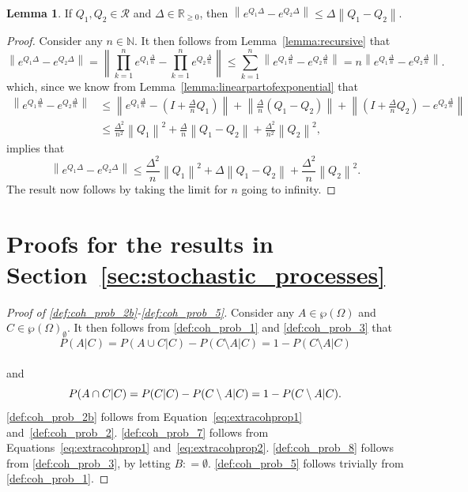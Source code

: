 \documentclass[10pt,a4paper]{paper}
\theoremstyle{definition}
\newtheorem{lemma}[theorem]{Lemma}
\newcommand{\nats}{\mathbb{N}}
\newcommand{\reals}{\mathbb{R}}
\newcommand{\realsnonneg}{\reals_{\geq 0}}
\newcommand{\paths}{\Omega}
\newcommand{\power}{\wp(\paths)}
\newcommand{\nonemptypower}{\power_{\emptyset}}
\newcommand{\norm}[1]{\left\lVert #1 \right\rVert}
\newcommand{\coloneqq}{:\!=}
\begin{document}
\begin{lemma}\label{lemma:differencebetweenexponentials}
If $Q_1,Q_2\in\mathcal{R}$ and $\Delta\in\realsnonneg$, then $\norm{e^{Q_1\Delta}-e^{Q_2\Delta}}\leq\Delta\norm{Q_1-Q_2}$.
\end{lemma}
\begin{proof}
Consider any $n\in\nats$. It then follows from Lemma~\ref{lemma:recursive} that
\begin{equation*}
\norm{e^{Q_1\Delta}-e^{Q_2\Delta}}
=\norm{\prod_{k=1}^n e^{Q_1\frac{\Delta}{n}}-\prod_{k=1}^n e^{Q_2\frac{\Delta}{n}}}
\leq\sum_{k=1}^n\norm{e^{Q_1\frac{\Delta}{n}}-e^{Q_2\frac{\Delta}{n}}}
=
n\norm{e^{Q_1\frac{\Delta}{n}}-e^{Q_2\frac{\Delta}{n}}}.
\end{equation*}
which, since we know from Lemma~\ref{lemma:linearpartofexponential} that
\begin{align*}
\norm{e^{Q_1\frac{\Delta}{n}}-e^{Q_2\frac{\Delta}{n}}}
&\leq
\norm{e^{Q_1\frac{\Delta}{n}}-(I+\frac{\Delta}{n}Q_1)}
+
\norm{\frac{\Delta}{n}(Q_1-Q_2)}
+\norm{(I+\frac{\Delta}{n}Q_2)-e^{Q_2\frac{\Delta}{n}}}\\
&\leq\frac{\Delta^2}{n^2}\norm{Q_1}^2
+
\frac{\Delta}{n}\norm{Q_1-Q_2}
+
\frac{\Delta^2}{n^2}\norm{Q_2}^2,
\end{align*}
implies that
\begin{equation*}
\norm{e^{Q_1\Delta}-e^{Q_2\Delta}}
\leq
\frac{\Delta^2}{n}\norm{Q_1}^2
+
\Delta\norm{Q_1-Q_2}
+
\frac{\Delta^2}{n}\norm{Q_2}^2.
\end{equation*}
The result now follows by taking the limit for $n$ going to infinity.
\end{proof}

\section{Proofs for the results in Section~\ref{sec:stochastic_processes}}\label{app:stoch_proc}

\begin{proof}[Proof of \ref{def:coh_prob_2b}-\ref{def:coh_prob_5}]
Consider any $A\in\power$ and $C\in\nonemptypower$. It then follows from \ref{def:coh_prob_1} and \ref{def:coh_prob_3} that
\vspace{-7pt}
\begin{equation}\label{eq:extracohprop1}
P(A\vert C)
=P(A\cup C\vert C)-P(C\setminus A\vert C)
=1-P(C\setminus A\vert C)
\end{equation}\\[-20pt]
and
\begin{equation}\label{eq:extracohprop2}
P(A\cap C\vert C)
=P(C\vert C)-P(C\setminus A\vert C)
=1-P(C\setminus A\vert C).
\vspace{6pt}
\end{equation}
\ref{def:coh_prob_2b} follows from Equation~\eqref{eq:extracohprop1} and~\ref{def:coh_prob_2}. \ref{def:coh_prob_7} follows from Equations~\eqref{eq:extracohprop1} and~\eqref{eq:extracohprop2}. \ref{def:coh_prob_8} follows from \ref{def:coh_prob_3}, by letting $B\coloneqq\emptyset$. \ref{def:coh_prob_5} follows trivially from \ref{def:coh_prob_1}.
\end{proof}
\end{document}

